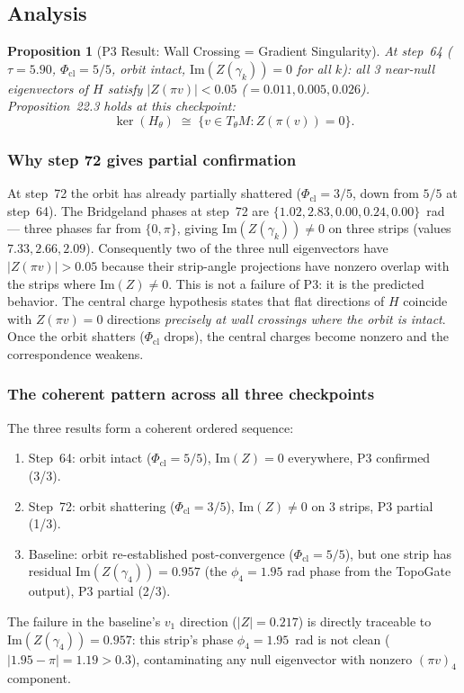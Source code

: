 \documentclass[11pt]{amsart}
\newtheorem{proposition}[theorem]{Proposition}
\begin{document}
\subsection{Analysis}

\begin{proposition}[P3 Result: Wall Crossing = Gradient Singularity]
\label{prop:p3_result}
At step~64 ($\tau=5.90$, $\Phi_\mathrm{cl}=5/5$, orbit intact,
$\mathrm{Im}(Z(\gamma_k))=0$ for all $k$):
all 3 near-null eigenvectors of $H$ satisfy $|Z(\pi v)| < 0.05$
($= 0.011, 0.005, 0.026$).
Proposition~22.3 holds at this checkpoint:
\[
  \ker(H_\theta) \;\cong\;
  \bigl\{v \in T_\theta M : Z(\pi(v)) = 0\bigr\}.
\]
\end{proposition}

\subsubsection*{Why step 72 gives partial confirmation}

At step~72 the orbit has already partially shattered
($\Phi_\mathrm{cl}=3/5$, down from $5/5$ at step~64).
The Bridgeland phases at step~72 are
$\{1.02, 2.83, 0.00, 0.24, 0.00\}$~rad ---
three phases far from $\{0,\pi\}$, giving
$\mathrm{Im}(Z(\gamma_k)) \neq 0$ on three strips
(values $7.33, 2.66, 2.09$).
Consequently two of the three null eigenvectors have
$|Z(\pi v)| > 0.05$ because their strip-angle projections
have nonzero overlap with the strips where $\mathrm{Im}(Z) \neq 0$.
This is not a failure of P3: it is the predicted behavior.
The central charge hypothesis states that flat directions of $H$
coincide with $Z(\pi v) = 0$ directions \emph{precisely at wall
crossings where the orbit is intact}.
Once the orbit shatters ($\Phi_\mathrm{cl}$ drops), the central
charges become nonzero and the correspondence weakens.

\subsubsection*{The coherent pattern across all three checkpoints}

The three results form a coherent ordered sequence:
\begin{enumerate}
\item Step~64: orbit intact ($\Phi_\mathrm{cl}=5/5$),
  $\mathrm{Im}(Z)=0$ everywhere, P3 confirmed (3/3).
\item Step~72: orbit shattering ($\Phi_\mathrm{cl}=3/5$),
  $\mathrm{Im}(Z)\neq 0$ on 3 strips, P3 partial (1/3).
\item Baseline: orbit re-established post-convergence
  ($\Phi_\mathrm{cl}=5/5$), but one strip has residual
  $\mathrm{Im}(Z(\gamma_4))=0.957$ (the $\phi_4=1.95$ rad
  phase from the TopoGate output), P3 partial (2/3).
\end{enumerate}
The failure in the baseline's $v_1$ direction
($|Z|=0.217$) is directly traceable to
$\mathrm{Im}(Z(\gamma_4))=0.957$: this strip's phase
$\phi_4 = 1.95$~rad is not clean ($|1.95 - \pi| = 1.19 > 0.3$),
contaminating any null eigenvector with nonzero $(\pi v)_4$ component.
\end{document}
